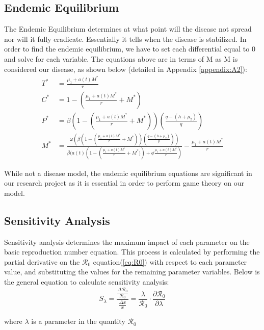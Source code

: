 \documentclass[12pt]{article}
\begin{document}
\subsection{Endemic Equilibrium}
The Endemic Equilibrium determines at what point will the disease not spread nor will it fully eradicate. Essentially it tells when the disease is stabilized. In order to find the endemic equilibrium, we have to set each differential equal to 0 and solve for each variable. The equations above are in terms of M as M is considered our disease, as shown below (detailed in Appendix \ref{appendix:A2}):
\begin{align*}
        T^{*} &= \frac{\mu_{1} + a(t)M^{*}}{r} \label{eq:T*}\\
        C^{*} %
        &= 1- \left(\frac{\mu_{1} + a(t)M^{*}}{r} + M^{*} \right) \label{eq:C*}\\
        P^{*} %
        &= \beta \left(1- \left(\frac{\mu_{1} + a(t)M^{*}}{r} + M^{*} \right) \right) \left(\frac{q-(h+\mu_{2})}{q} \right) \label{eq:P*}\\
        M^{*} &= \frac{\omega (\beta \left(1- \left(\frac{\mu_{1} + a(t)M^{*}}{r} + M^{*} \right) \right) \left(\frac{q-(h+\mu_{2})}{q} \right))}{\beta(a(t)(1- \left(\frac{\mu_{1} + a(t)M^{*}}{r} + M^{*}) \right)+\phi \frac{\mu_{1} + a(t)M^{*}}{r})} - \frac{\mu_{1} + a(t)M^{*}}{r} \label{eq:M*}
\end{align*}

While not a disease model, the endemic equilibrium equations are significant in our research project as it is essential in order to perform game theory on our model. 

\subsection{Sensitivity Analysis}
Sensitivity analysis determines the maximum impact of each parameter on the basic reproduction number equation. This process is calculated by performing the partial derivative on the $\mathscr{R}_0$ equation(\ref{eq:R0}) with respect to each parameter value, and substituting the values for the remaining parameter variables. Below is the general equation to calculate sensitivity analysis: \\
\begin{equation*}\label{eq:sens_analysis}
        S_{\lambda} = \frac{\frac{\Delta \mathscr{R}_{0}}{\mathscr{R}_{0}}}{\frac{\Delta x}{x}} = \frac{\lambda}{\mathscr{R}_{0}} \cdot \frac{\partial \mathscr{R}_{0}}{\partial \lambda}
\end{equation*}
\begin{center}
    where $\lambda$ is a parameter in the quantity $\mathscr{R}_{0}$
\end{center}
\end{document}
